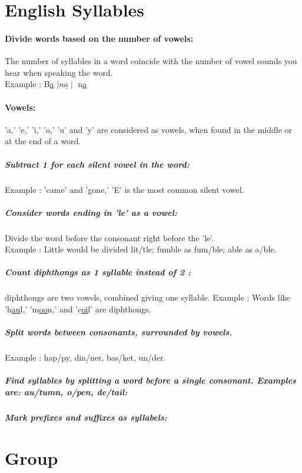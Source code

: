 \documentclass[12pt]{article}
\begin{document}
%
%
\section{English Syllables}
\paragraph{Divide words based on the number of vowels: } The number of syllables in a word coincide with the number of vowel sounds you hear when speaking the word.  \\

Example : B\underline{a} $\mid n\underline{a} \mid$ n\underline{a}

\paragraph{Vowels:} 'a,' 'e,' 'i,' 'o,' 'u' and 'y' are considered as vowels, when found in the middle or at the end of a word.

\subparagraph{Subtract 1 for each silent vowel in the word:} Example : 'came' and 'gone,' 'E' is the most common silent vowel.

\subparagraph{Consider words ending in 'le' as a vowel:} Divide the word before the consonant right before the 'le'. \\
Example : Little would be divided lit/tle; fumble as fum/ble; able as a/ble.

\subparagraph{Count diphthongs as 1 syllable instead of 2 : } diphthongs are two vowels, combined giving one syllable. Example : Words like 'h\underline{au}l,' 'm\underline{oo}n,' and 'c\underline{oi}l' are diphthongs.

\subparagraph{Split words between consonants, surrounded by vowels.} Example :  hap/py, din/ner, bas/ket, un/der. 

\subparagraph{Find syllables by splitting a word before a single consonant. Examples are: au/tumn, o/pen, de/tail:}

\subparagraph{Mark prefixes and suffixes as syllabels: }



%
%
\pagebreak
\section{Group}
\end{document}
